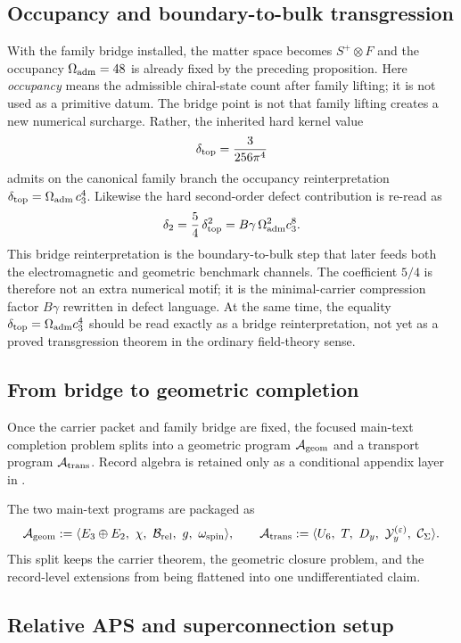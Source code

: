 \subsection{Occupancy and boundary-to-bulk transgression}

With the family bridge installed, the matter space becomes $S^+\otimes F$ and the occupancy $\Omega_{\mathrm{adm}}=48$ is already fixed by the preceding proposition. Here \emph{occupancy} means the admissible chiral-state count after family lifting; it is not used as a primitive datum. The bridge point is not that family lifting creates a new numerical surcharge. Rather, the inherited hard kernel value
\[
\delta_{\mathrm{top}}=\frac{3}{256\pi^4}
\]
admits on the canonical family branch the occupancy reinterpretation $\delta_{\mathrm{top}}=\Omega_{\mathrm{adm}}\,c_3^4$.
Likewise the hard second-order defect contribution is re-read as
\[
\delta_2=\frac54\,\delta_{\mathrm{top}}^2=B\gamma\,\Omega_{\mathrm{adm}}^2c_3^8.
\]
This bridge reinterpretation is the boundary-to-bulk step that later feeds both the electromagnetic and geometric benchmark channels. The coefficient $5/4$ is therefore not an extra numerical motif; it is the minimal-carrier compression factor $B\gamma$ rewritten in defect language. At the same time, the equality $\delta_{\mathrm{top}}=\Omega_{\mathrm{adm}}c_3^4$ should be read exactly as a bridge reinterpretation, not yet as a proved transgression theorem in the ordinary field-theory sense.

\subsection{From bridge to geometric completion}

\begin{principle}
Once the carrier packet and family bridge are fixed, the focused main-text completion problem splits into a geometric program $\mathcal A_{\mathrm{geom}}$ and a transport program $\mathcal A_{\mathrm{trans}}$. Record algebra is retained only as a conditional appendix layer in .
\end{principle}

The two main-text programs are packaged as
\[
\Ageom
:=
\langle E_3\oplus E_2,\ \chi,\ \mathcal B_{\mathrm{rel}},\ g,\ \omega_{\mathrm{spin}}\rangle,
\qquad
\Atrans
:=
\langle U_6,\ T,\ D_y,\ \mathcal Y_y^{(\varepsilon)},\ \mathcal C_{\Seam}\rangle.
\]
This split keeps the carrier theorem, the geometric closure problem, and the record-level extensions from being flattened into one undifferentiated claim.

\subsection{Relative APS and superconnection setup}

